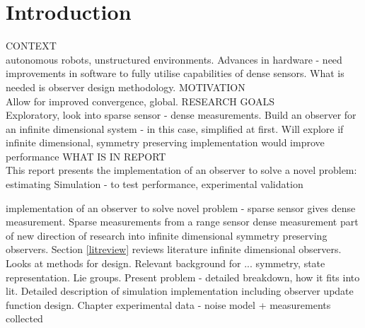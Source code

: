 \chapter{Introduction}

CONTEXT\\
	autonomous robots, unstructured environments. Advances in hardware - need improvements in software to fully utilise capabilities of dense sensors.
	What is needed is observer design methodology.
MOTIVATION\\
	Allow for improved convergence, global. 
RESEARCH     GOALS\\
	Exploratory, look into sparse sensor - dense measurements. Build an observer for an infinite dimensional system - in this case, simplified at first. Will explore if infinite dimensional, symmetry preserving implementation would improve performance
WHAT IS IN REPORT\\
	This report presents the implementation of an observer to solve a novel problem: estimating
	Simulation - to test performance, experimental validation
	
	implementation of an observer to solve novel problem - sparse sensor gives dense measurement.
	Sparse measurements from a range sensor
	dense measurement part of new direction of research into infinite dimensional symmetry preserving observers.
	Section \ref{litreview} reviews literature infinite dimensional observers. Looks at methods for design.
	Relevant background for ... symmetry, state representation. Lie groups. 
	Present problem - detailed breakdown, how it fits into lit. 
	Detailed description of simulation implementation including observer update function design.
	Chapter 
	experimental data - noise model + measurements collected

